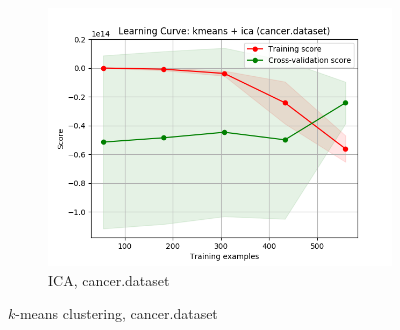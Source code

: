 \documentclass{article}
\begin{document}
\begin{figure}[htb]
\begin{subfigure}{0.33\textwidth}
        \includegraphics[width=\linewidth]{out/cluster_dr/cancer-kmeans-ica-learning.png}
        \caption{ICA, cancer.dataset}
      \end{subfigure}

    \caption{$k$-means clustering, cancer.dataset}
    \label{fig:cdr-plot-km-cancer}
    \end{figure}
\end{document}
